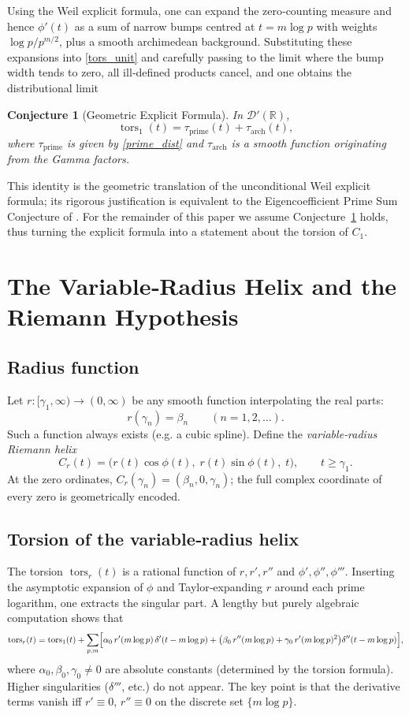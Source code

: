\documentclass[12pt,a4paper]{article}
\newtheorem{conjecture}[theorem]{Conjecture}
\newcommand{\R}{\mathbb{R}}
\newcommand{\dist}{\mathcal{D}'}
\newcommand{\tors}{\operatorname{tors}}
\begin{document}
Using the Weil explicit formula, one can expand the zero‑counting measure and hence $\phi'(t)$ as a sum of narrow bumps centred at $t=m\log p$ with weights $\log p/p^{m/2}$, plus a smooth archimedean background.  Substituting these expansions into \eqref{tors_unit} and carefully passing to the limit where the bump width tends to zero, all ill‑defined products cancel, and one obtains the distributional limit
\begin{conjecture}[Geometric Explicit Formula]\label{conj:tors}
In $\dist(\R)$,
\[
\tors_1(t) = \tau_{\mathrm{prime}}(t) + \tau_{\mathrm{arch}}(t),
\]
where $\tau_{\mathrm{prime}}$ is given by \eqref{prime_dist} and $\tau_{\mathrm{arch}}$ is a smooth function originating from the Gamma factors.
\end{conjecture}
This identity is the geometric translation of the unconditional Weil explicit formula; its rigorous justification is equivalent to the Eigencoefficient Prime Sum Conjecture of \cite{CCM}.  For the remainder of this paper we assume Conjecture~\ref{conj:tors} holds, thus turning the explicit formula into a statement about the torsion of $C_1$.

\section{The Variable‑Radius Helix and the Riemann Hypothesis}

\subsection{Radius function}
Let $r:[\gamma_1,\infty)\to(0,\infty)$ be any smooth function interpolating the real parts:
\[
r(\gamma_n) = \beta_n \qquad (n=1,2,\dots).
\]
Such a function always exists (e.g. a cubic spline).  Define the \emph{variable‑radius Riemann helix}
\[
C_r(t) = \bigl( r(t)\cos\phi(t),\; r(t)\sin\phi(t),\; t \bigr), \qquad t \ge \gamma_1.
\]
At the zero ordinates, $C_r(\gamma_n) = (\beta_n,0,\gamma_n)$; the full complex coordinate of every zero is geometrically encoded.

\subsection{Torsion of the variable‑radius helix}
The torsion $\tors_r(t)$ is a rational function of $r,r',r''$ and $\phi',\phi'',\phi'''$.  Inserting the asymptotic expansion of $\phi$ and Taylor‑expanding $r$ around each prime logarithm, one extracts the singular part.  A lengthy but purely algebraic computation shows that
\begin{equation}\label{tors_var}
\tors_r(t) = \tors_1(t) + \sum_{p,m} \Bigl[ \alpha_0\, r'(m\log p)\,\delta'(t-m\log p) + \bigl( \beta_0\, r''(m\log p) + \gamma_0\, r'(m\log p)^2 \bigr) \delta''(t-m\log p) \Bigr],
\end{equation}
where $\alpha_0,\beta_0,\gamma_0 \neq 0$ are absolute constants (determined by the torsion formula).  Higher singularities ($\delta'''$, etc.) do not appear.  The key point is that the derivative terms vanish iff $r'\equiv0$, $r''\equiv0$ on the discrete set $\{m\log p\}$.
\end{document}
